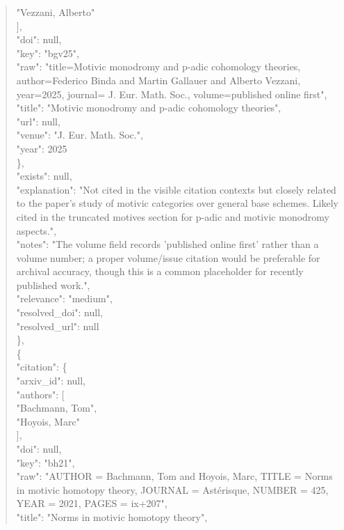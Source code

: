 \documentclass[11pt]{article}
\begin{document}
\begin{quote}
          "Vezzani, Alberto"\\
        ],\\
        "doi": null,\\
        "key": "bgv25",\\
        "raw": "title=Motivic monodromy and p-adic cohomology theories, author=Federico Binda and Martin Gallauer and Alberto Vezzani, year=2025, journal= J. Eur. Math. Soc., volume=published online first",\\
        "title": "Motivic monodromy and p-adic cohomology theories",\\
        "url": null,\\
        "venue": "J. Eur. Math. Soc.",\\
        "year": 2025\\
      \},\\
      "exists": null,\\
      "explanation": "Not cited in the visible citation contexts but closely related to the paper's study of motivic categories over general base schemes. Likely cited in the truncated motives section for p-adic and motivic monodromy aspects.",\\
      "notes": "The volume field records 'published online first' rather than a volume number; a proper volume/issue citation would be preferable for archival accuracy, though this is a common placeholder for recently published work.",\\
      "relevance": "medium",\\
      "resolved\_doi": null,\\
      "resolved\_url": null\\
    \},\\
    \{\\
      "citation": \{\\
        "arxiv\_id": null,\\
        "authors": [\\
          "Bachmann, Tom",\\
          "Hoyois, Marc"\\
        ],\\
        "doi": null,\\
        "key": "bh21",\\
        "raw": "AUTHOR = Bachmann, Tom and Hoyois, Marc, TITLE = Norms in motivic homotopy theory, JOURNAL = Astérisque, NUMBER = 425, YEAR = 2021, PAGES = ix+207",\\
        "title": "Norms in motivic homotopy theory",\\

\end{quote}
\end{document}
